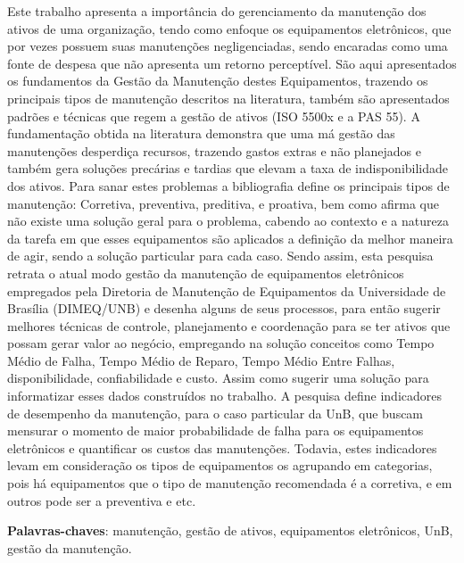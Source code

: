 \begin{resumo}
 
Este trabalho apresenta a importância do gerenciamento da manutenção dos ativos de uma organização, tendo como enfoque os equipamentos eletrônicos, que por vezes possuem suas manutenções negligenciadas, sendo encaradas como uma fonte de despesa que não apresenta um retorno perceptível. São aqui apresentados os fundamentos da Gestão da Manutenção destes Equipamentos, trazendo os principais tipos de manutenção descritos na literatura, também são apresentados padrões e técnicas que regem a gestão de ativos (ISO 5500x e a PAS 55). 
A fundamentação obtida na literatura demonstra que uma má gestão das manutenções desperdiça recursos, trazendo gastos extras e não planejados e também gera soluções precárias e tardias que elevam a taxa de indisponibilidade dos ativos. Para sanar estes problemas a bibliografia define os principais tipos de manutenção: Corretiva, preventiva, preditiva, e proativa, bem como afirma que não existe uma solução geral para o problema, cabendo ao contexto e a natureza da tarefa em que esses equipamentos são aplicados a definição da melhor maneira de agir, sendo a solução particular para cada caso. 
Sendo assim, esta pesquisa retrata o atual modo gestão da manutenção de equipamentos eletrônicos empregados pela Diretoria de Manutenção de Equipamentos da Universidade de Brasília (DIMEQ/UNB) e desenha alguns de seus processos, para então sugerir melhores técnicas de controle, planejamento e coordenação para se ter ativos que possam gerar valor ao negócio, empregando na solução conceitos como Tempo Médio de Falha, Tempo Médio de Reparo, Tempo Médio Entre Falhas, disponibilidade, confiabilidade e custo. Assim como sugerir uma solução para informatizar esses dados construídos no trabalho.
A pesquisa define indicadores de desempenho da manutenção, para o caso particular da UnB, que buscam mensurar o momento de maior probabilidade de falha para os equipamentos eletrônicos e quantificar os custos das manutenções. Todavia, estes indicadores levam em consideração os tipos de equipamentos os agrupando em categorias, pois há equipamentos que o tipo de manutenção recomendada é a corretiva, e em outros pode ser a preventiva e etc.


 \vspace{\onelineskip}
    
 \noindent
 \textbf{Palavras-chaves}: manutenção, gestão de ativos, equipamentos eletrônicos, UnB, gestão da manutenção.
\end{resumo}
